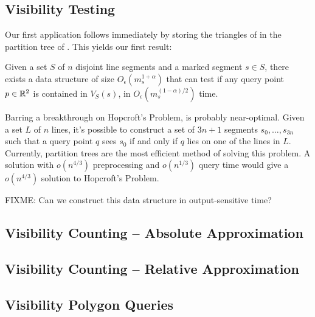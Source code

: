 \documentclass{patmorin}
\newcommand{\Oe}{O_\epsilon}
\begin{document}
\subsection{Visibility Testing}

Our first application follows immediately by storing the triangles of
 in the partition tree of .  This
yields our first result:

\begin{thm}
Given a set $S$ of $n$ disjoint line segments and a marked segment
$s\in S$, there exists a data structure of size $\Oe(m_s^{1+\alpha})$
that can test if any query point $p\in\mathbb{R}^2$ is contained in $V_S(s)$,
in $\Oe(m_s^{(1-\alpha)/2})$ time.
\end{thm}

Barring a breakthrough on Hopcroft's Problem,  is
probably near-optimal.  Given a set $L$ of $n$ lines, it's possible to
construct a set of $3n+1$ segments $s_0,\ldots,s_{3n}$ such that a query
point $q$ sees $s_0$ if and only if $q$ lies on one of the lines in $L$.
Currently, partition trees are the most efficient method of solving this
problem.  A solution with $o(n^{4/3})$ preprocessing and $o(n^{1/3})$ query
time would give a $o(n^{4/3})$ solution to Hopcroft's Problem.

FIXME: Can we construct this data structure in output-sensitive time?

\subsection{Visibility Counting -- Absolute Approximation}



\subsection{Visibility Counting -- Relative Approximation}

\subsection{Visibility Polygon Queries}
\end{document}
